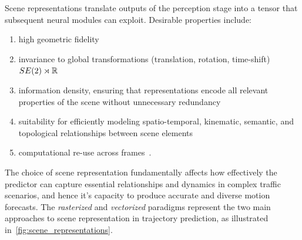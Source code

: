 Scene representations translate outputs of the perception stage into a tensor that subsequent neural modules can exploit. Desirable properties include:
\begin{enumerate}[label=(\roman*)]
    \item high geometric fidelity
    \item invariance to global transformations (translation, rotation, time-shift) \( SE(2) \rtimes \mathbb{R} \)
    \item information density, ensuring that representations encode all relevant properties of the scene without unnecessary redundancy
    \item suitability for efficiently modeling spatio-temporal, kinematic, semantic, and topological relationships between scene elements
    \item computational re-use across frames~\cite{qcnetZhou2023,lmformerYadav2025}.
\end{enumerate}
The choice of scene representation fundamentally affects how effectively the predictor can capture essential relationships and dynamics in complex traffic scenarios, and hence it's capacity to produce accurate and diverse motion forecasts. The \emph{rasterized} and \emph{vectorized} paradigms represent the two main approaches to scene representation in trajectory prediction, as illustrated in~\autoref{fig:scene_representations}.

